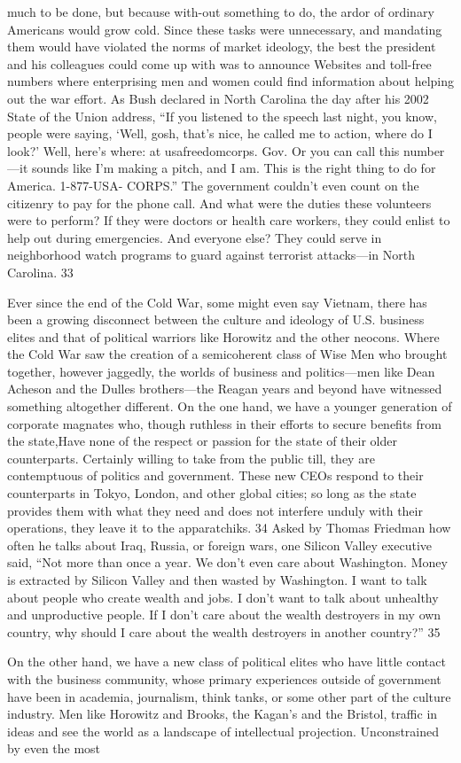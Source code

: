 much to be done, but because with-out something to do, the ardor of ordinary Americans would grow cold. Since these tasks were unnecessary, and mandating them would have violated the norms of market ideology, the best the president and his colleagues could come up with was to announce Websites and toll-free numbers where enterprising men and women could find information about helping out the war effort. As Bush declared in North Carolina the day after his 2002 State of the Union address, “If you listened to the speech last night, you know, people were saying, ‘Well, gosh, that’s nice, he called me to action, where do I look?’ Well, here’s where: at usafreedomcorps. Gov. Or you can call this number—it sounds like I’m making a pitch, and I am. This is the right thing to do for America. 1-877-USA- CORPS.” The government couldn’t even count on the citizenry to pay for the phone call. And what were the duties these volunteers were to perform? If they were doctors or health care workers, they could enlist to help out during emergencies. And everyone else? They could serve in neighborhood watch programs to guard against terrorist attacks—in North Carolina. {\color{blue} 33 } {\par} Ever since the end of the Cold War, some might even say Vietnam, there has been a growing disconnect between the culture and ideology of U.S. business elites and that of political warriors like Horowitz and the other neocons. Where the Cold War saw the creation of a semicoherent class of Wise Men who brought together, however jaggedly, the worlds of business and politics—men like Dean Acheson and the Dulles brothers—the Reagan years and beyond have witnessed something altogether different. On the one hand, we have a younger generation of corporate magnates who, though ruthless in their efforts to secure benefits from the state,Have none of the respect or passion for the state of their older counterparts. Certainly willing to take from the public till, they are contemptuous of politics and government. These new CEOs respond to their counterparts in Tokyo, London, and other global cities; so long as the state provides them with what they need and does not interfere unduly with their operations, they leave it to the apparatchiks. {\color{blue} 34 } Asked by Thomas Friedman how often he talks about Iraq, Russia, or foreign wars, one Silicon Valley executive said, “Not more than once a year. We don’t even care about Washington. Money is extracted by Silicon Valley and then wasted by Washington. I want to talk about people who create wealth and jobs. I don’t want to talk about unhealthy and unproductive people. If I don’t care about the wealth destroyers in my own country, why should I care about the wealth destroyers in another country?” {\color{blue} 35 } {\par} On the other hand, we have a new class of political elites who have little contact with the business community, whose primary experiences outside of government have been in academia, journalism, think tanks, or some other part of the culture industry. Men like Horowitz and Brooks, the Kagan's and the Bristol, traffic in ideas and see the world as a landscape of intellectual projection. Unconstrained by even the most 